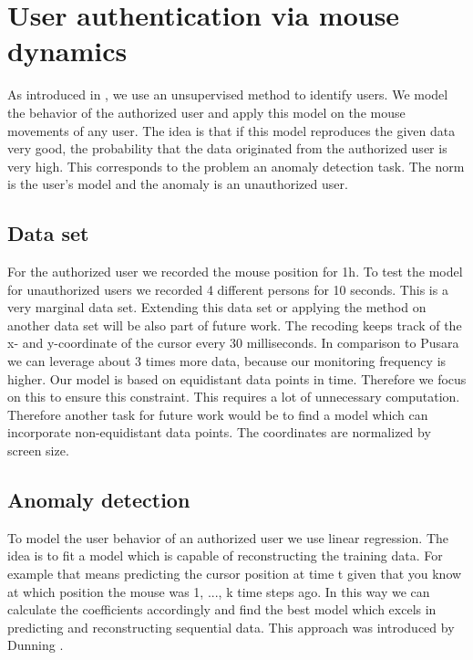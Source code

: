 \documentclass[conference]{IEEEtran}
\begin{document}
\section{User authentication via mouse dynamics}

As introduced in \cite{pusara2004user}, we use an unsupervised method to identify users. We model the behavior of the authorized user and apply this model on the mouse movements of any user. The idea is that if this model reproduces the given data very good, the probability that the data originated from the authorized user is very high. This corresponds to the problem an anomaly detection task. The norm is the user's model and the anomaly is an unauthorized user.

\subsection{Data set}

For the authorized user we recorded the mouse position for 1h. To test the model for unauthorized users we recorded 4 different persons for 10 seconds. This is a very marginal data set. Extending this data set or applying the method on another data set will be also part of future work. 
The recoding keeps track of the x- and y-coordinate of the cursor every 30 milliseconds. In comparison to Pusara \cite{pusara2004user} we can leverage about 3 times more data, because our monitoring frequency is higher. Our model is based on equidistant data points in time. Therefore we focus on this to ensure this constraint. This requires a lot of unnecessary computation. Therefore another task for future work would be to find a model which can incorporate non-equidistant data points.
The coordinates are normalized by screen size. 

\subsection{Anomaly detection}

To model the user behavior of an authorized user we use linear regression. The idea is to fit a model which is capable of reconstructing the training data. For example that means predicting the cursor position at time t given that you know at which position the mouse was 1, ..., k time steps ago. In this way we can calculate the
coefficients accordingly and find the best model which excels in predicting and reconstructing sequential data. This approach was introduced by Dunning \cite{dunning2014practical}.
\end{document}
